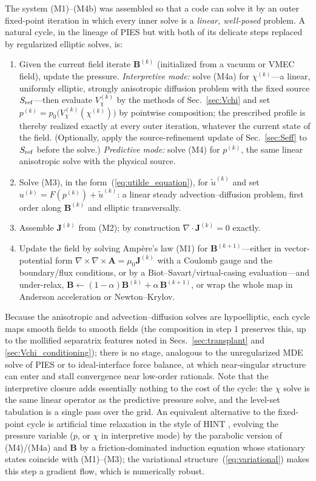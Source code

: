 \documentclass[english]{article}
\newcommand{\bB}{\mathbf{B}}
\newcommand{\bJ}{\mathbf{J}}
\begin{document}
The system (M1)--(M4b) was assembled so that a code can solve it by an outer fixed-point iteration
in which every inner solve is a \emph{linear, well-posed} problem. A natural cycle, in the lineage
of PIES \cite{reiman1986} but with both of its delicate steps replaced by regularized elliptic
solves, is:
\begin{enumerate}
\item Given the current field iterate $\bB^{(k)}$ (initialized from a vacuum or VMEC
\cite{hirshman1983} field), update the pressure. \emph{Interpretive mode:} solve (M4a) for
$\chi^{(k)}$---a linear, uniformly elliptic, strongly anisotropic diffusion problem with the fixed
source $S_{\rm ref}$---then evaluate $V_\chi^{(k)}$ by the methods of Sec.~\ref{sec:Vchi} and set
$p^{(k)}=p_0\big(V_\chi^{(k)}(\chi^{(k)})\big)$ by pointwise composition; the prescribed profile
is thereby realized exactly at every outer iteration, whatever the current state of the field.
(Optionally, apply the source-refinement update of Sec.~\ref{sec:Seff} to $S_{\rm ref}$ before the
solve.) \emph{Predictive mode:} solve (M4) for $p^{(k)}$, the same linear anisotropic solve with
the physical source.
\item Solve (M3), in the form~(\ref{eq:utilde_equation}), for $\tilde u^{(k)}$ and set
$u^{(k)}=F(p^{(k)})+\tilde u^{(k)}$: a linear steady advection--diffusion problem, first order
along $\bB^{(k)}$ and elliptic transversally.
\item Assemble $\bJ^{(k)}$ from (M2); by construction $\nabla\cdot\bJ^{(k)}=0$ exactly.
\item Update the field by solving Amp\`ere's law (M1) for $\bB^{(k+1)}$---either in vector-potential
form $\nabla\times\nabla\times\mathbf{A}=\mu_0\bJ^{(k)}$ with a Coulomb gauge and the boundary/flux
conditions, or by a Biot--Savart/virtual-casing evaluation---and under-relax,
$\bB\leftarrow(1-\alpha)\bB^{(k)}+\alpha\,\bB^{(k+1)}$, or wrap the whole map in Anderson
acceleration or Newton--Krylov.
\end{enumerate}
Because the anisotropic and advection--diffusion solves are hypoelliptic, each cycle maps smooth
fields to smooth fields (the composition in step 1 preserves this, up to the mollified
separatrix features noted in Secs.~\ref{sec:transplant} and \ref{sec:Vchi_conditioning}); there is
no stage, analogous to the unregularized MDE solve of PIES or to ideal-interface force balance, at
which near-singular structure can enter and stall convergence near low-order rationals. Note that
the interpretive closure adds essentially nothing to the cost of the cycle: the $\chi$ solve is
the same linear operator as the predictive pressure solve, and the level-set tabulation is a
single pass over the grid. An
equivalent alternative to the fixed-point cycle is artificial time relaxation in the style of HINT
\cite{harafuji1989,suzuki2006}, evolving the pressure variable ($p$, or $\chi$ in interpretive
mode) by the parabolic version of (M4)/(M4a) and $\bB$ by a
friction-dominated induction equation whose stationary states coincide with (M1)--(M3); the
variational structure~(\ref{eq:variational}) makes this step a gradient flow, which is
numerically robust.
\end{document}
